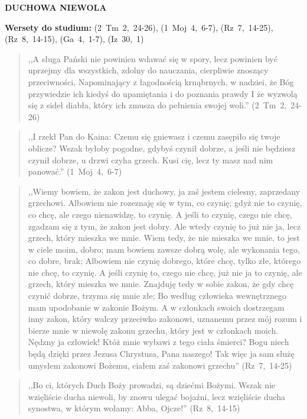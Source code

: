 \documentclass[10pt,a4paper,oneside]{article}
\begin{document}
\centerline{\textbf{\MakeUppercase{Duchowa niewola}}}
\begin{center}
\textbf{Wersety do studium:} \mbox{(2 Tm 2, 24-26)}, \mbox{(1 Moj 4, 6-7)}, \mbox{(Rz 7, 14-25)}, \mbox{(Rz 8, 14-15)}, \mbox{(Ga 4, 1-7)}, \mbox{(Iz 30, 1)}
\end{center}
\begin{quote}
,,A sługa Pański nie powinien wdawać się w spory, lecz powinien być uprzejmy dla wszystkich, zdolny do nauczania, cierpliwie znoszący przeciwności, Napominający z łagodnością krnąbrnych, w nadziei, że Bóg przywiedzie ich kiedyś do upamiętania i do poznania prawdy I że wyzwolą się z sideł diabła, który ich zmusza do pełnienia swojej woli.'' \mbox{(2 Tm 2, 24-26)}
\end{quote}
\begin{quote}
,,I rzekł Pan do Kaina: Czemu się gniewasz i czemu zasępiło się twoje oblicze? Wszak byłoby pogodne, gdybyś czynił dobrze, a jeśli nie będziesz czynił dobrze, u drzwi czyha grzech. Kusi cię, lecz ty masz nad nim panować.'' \mbox{(1 Moj 4, 6-7)}
\end{quote}
\begin{quote}
,,Wiemy bowiem, że zakon jest duchowy, ja zaś jestem cielesny, zaprzedany grzechowi. Albowiem nie rozeznaję się w tym, co czynię; gdyż nie to czynię, co chcę, ale czego nienawidzę, to czynię. A jeśli to czynię, czego nie chcę, zgadzam się z tym, że zakon jest dobry. Ale wtedy czynię to już nie ja, lecz grzech, który mieszka we mnie. Wiem tedy, że nie mieszka we mnie, to jest w ciele moim, dobro; mam bowiem zawsze dobrą wolę, ale wykonania tego, co dobre, brak; Albowiem nie czynię dobrego, które chcę, tylko złe, którego nie chcę, to czynię. A jeśli czynię to, czego nie chcę, już nie ja to czynię, ale grzech, który mieszka we mnie. Znajduję tedy w sobie zakon, że gdy chcę czynić dobrze, trzyma się mnie złe; Bo według człowieka wewnętrznego mam upodobanie w zakonie Bożym. A w członkach swoich dostrzegam inny zakon, który walczy przeciwko zakonowi, uznanemu przez mój rozum i bierze mnie w niewolę zakonu grzechu, który jest w członkach moich. Nędzny ja człowiek! Któż mnie wybawi z tego ciała śmierci? Bogu niech będą dzięki przez Jezusa Chrystusa, Pana naszego! Tak więc ja sam służę umysłem zakonowi Bożemu, ciałem zaś zakonowi grzechu'' \mbox{(Rz 7, 14-25)}
\end{quote}
\begin{quote}
,,Bo ci, których Duch Boży prowadzi, są dziećmi Bożymi. Wszak nie wzięliście ducha niewoli, by znowu ulegać bojaźni, lecz wzięliście ducha synostwa, w którym wołamy: Abba, Ojcze!'' \mbox{(Rz 8, 14-15)}
\end{quote}
\end{document}
